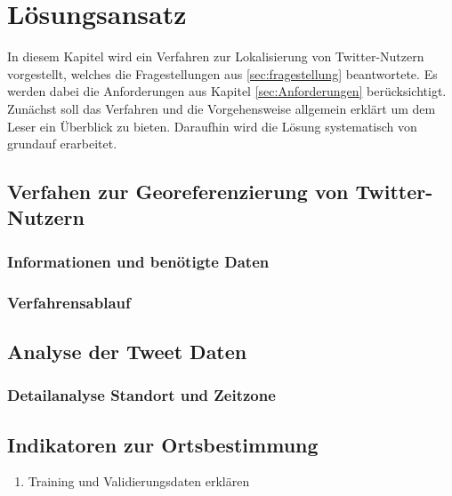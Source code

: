 \chapter{Lösungsansatz} \label{chp:Loesungsansatz}
In diesem Kapitel wird ein Verfahren zur Lokalisierung von Twitter-Nutzern vorgestellt, welches die Fragestellungen aus \ref{sec:fragestellung} beantwortete.
Es werden dabei die Anforderungen aus Kapitel \ref{sec:Anforderungen} berücksichtigt.
Zunächst soll das Verfahren und die Vorgehensweise allgemein erklärt um dem Leser ein Überblick zu bieten. 
Daraufhin wird die Lösung systematisch von grundauf erarbeitet.    

\section{Verfahen zur Georeferenzierung von Twitter-Nutzern}

	\subsection{Informationen und benötigte Daten}

	\subsection{Verfahrensablauf}


\section{Analyse der Tweet Daten}
	
	

	\subsection{Detailanalyse Standort und Zeitzone}



\section{Indikatoren zur Ortsbestimmung}

	\begin{enumerate}
		\item{Training und Validierungsdaten erklären} 
	\end{enumerate}


